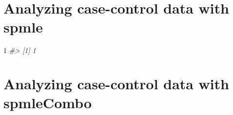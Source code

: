 \documentclass[]{article}
\newenvironment{Shaded}{\begin{snugshade}}{\end{snugshade}}
\newcommand{\DecValTok}[1]{\textcolor[rgb]{0.00,0.00,0.81}{#1}}
\newcommand{\CommentTok}[1]{\textcolor[rgb]{0.56,0.35,0.01}{\textit{#1}}}
\begin{document}
\section{Analyzing case-control data with spmle} \label{sec:spmle}

\begin{Shaded}
\begin{Highlighting}[]
\DecValTok{1}
\CommentTok{#> [1] 1}
\end{Highlighting}
\end{Shaded}

\section{Analyzing case-control data with spmleCombo} \label{sec:spmleCombo}


\end{document}
